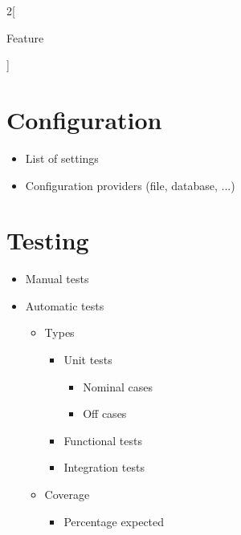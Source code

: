 \documentclass[10pt]{article}
\begin{document}
\begin{multicols}{2}[
    \begin{center}
      \Huge{Feature}
    \end{center}
    ]
    \section*{Configuration}
    \begin{itemize}    
      \item List of settings
      \item Configuration providers (file, database, ...)
    \end{itemize}
  
    \section*{Testing}
    \begin{itemize}
      \item Manual tests
      \item Automatic tests
      \begin{itemize}
        \item Types
        \begin{itemize}
          \item Unit tests
          \begin{itemize}
            \item Nominal cases
            \item Off cases
          \end{itemize}
          \item Functional tests
          \item Integration tests
        \end{itemize}
        \item Coverage
        \begin{itemize}
          \item Percentage expected
        \end{itemize}
      \end{itemize}
    \end{itemize}
  
  \end{multicols}
\end{document}

